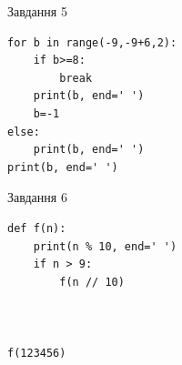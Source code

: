 \documentclass[12pt, ukrainian]{article}
\begin{document}
{\vspace{15mm}
\begin{minipage}[t]{9.7cm}                
{\begin{center}Завдання {5}\end{center}}
\begin{verbatim}
for b in range(-9,-9+6,2):
    if b>=8:
        break
    print(b, end=' ')
    b=-1
else:
    print(b, end=' ')
print(b, end=' ')
\end{verbatim}     
\end{minipage}
\vline \hspace{8mm}
\begin{minipage}[t]{8.0cm}                
{\begin{center}Завдання {6}\end{center}}
\begin{verbatim}
def f(n):
    print(n % 10, end=' ')
    if n > 9:
        f(n // 10)
    


f(123456)
\end{verbatim}     
\end{minipage}

}
\newpage
\end{document}
